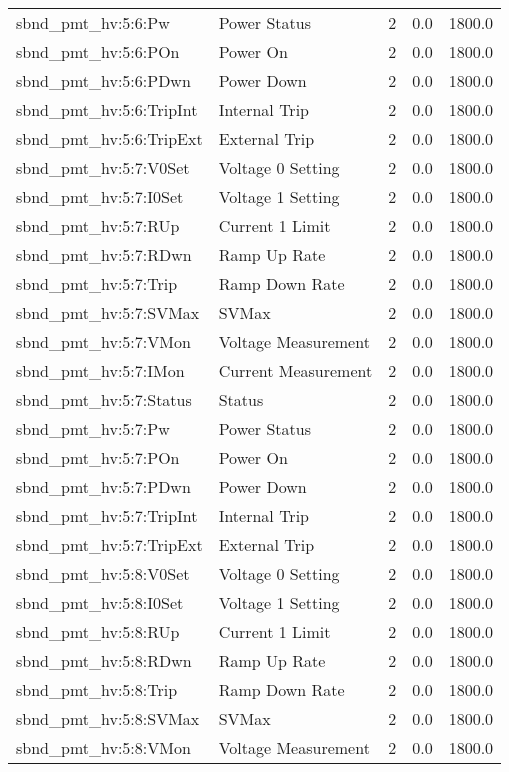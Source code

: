 \begin{center}
\begin{longtable}{l | l l l l }
sbnd\_pmt\_hv:5:6:Pw & Power Status & 2 & 0.0 & 1800.0\\ 
sbnd\_pmt\_hv:5:6:POn & Power On & 2 & 0.0 & 1800.0\\ 
sbnd\_pmt\_hv:5:6:PDwn & Power Down & 2 & 0.0 & 1800.0\\ 
sbnd\_pmt\_hv:5:6:TripInt & Internal Trip & 2 & 0.0 & 1800.0\\ 
sbnd\_pmt\_hv:5:6:TripExt & External Trip & 2 & 0.0 & 1800.0\\ 
sbnd\_pmt\_hv:5:7:V0Set & Voltage 0 Setting & 2 & 0.0 & 1800.0\\ 
sbnd\_pmt\_hv:5:7:I0Set & Voltage 1 Setting & 2 & 0.0 & 1800.0\\ 
sbnd\_pmt\_hv:5:7:RUp & Current 1 Limit & 2 & 0.0 & 1800.0\\ 
sbnd\_pmt\_hv:5:7:RDwn & Ramp Up Rate & 2 & 0.0 & 1800.0\\ 
sbnd\_pmt\_hv:5:7:Trip & Ramp Down Rate & 2 & 0.0 & 1800.0\\ 
sbnd\_pmt\_hv:5:7:SVMax & SVMax & 2 & 0.0 & 1800.0\\ 
sbnd\_pmt\_hv:5:7:VMon & Voltage Measurement & 2 & 0.0 & 1800.0\\ 
sbnd\_pmt\_hv:5:7:IMon & Current Measurement & 2 & 0.0 & 1800.0\\ 
sbnd\_pmt\_hv:5:7:Status & Status & 2 & 0.0 & 1800.0\\ 
sbnd\_pmt\_hv:5:7:Pw & Power Status & 2 & 0.0 & 1800.0\\ 
sbnd\_pmt\_hv:5:7:POn & Power On & 2 & 0.0 & 1800.0\\ 
sbnd\_pmt\_hv:5:7:PDwn & Power Down & 2 & 0.0 & 1800.0\\ 
sbnd\_pmt\_hv:5:7:TripInt & Internal Trip & 2 & 0.0 & 1800.0\\ 
sbnd\_pmt\_hv:5:7:TripExt & External Trip & 2 & 0.0 & 1800.0\\ 
sbnd\_pmt\_hv:5:8:V0Set & Voltage 0 Setting & 2 & 0.0 & 1800.0\\ 
sbnd\_pmt\_hv:5:8:I0Set & Voltage 1 Setting & 2 & 0.0 & 1800.0\\ 
sbnd\_pmt\_hv:5:8:RUp & Current 1 Limit & 2 & 0.0 & 1800.0\\ 
sbnd\_pmt\_hv:5:8:RDwn & Ramp Up Rate & 2 & 0.0 & 1800.0\\ 
sbnd\_pmt\_hv:5:8:Trip & Ramp Down Rate & 2 & 0.0 & 1800.0\\ 
sbnd\_pmt\_hv:5:8:SVMax & SVMax & 2 & 0.0 & 1800.0\\ 
sbnd\_pmt\_hv:5:8:VMon & Voltage Measurement & 2 & 0.0 & 1800.0\\ 

\end{longtable}
\end{center}
